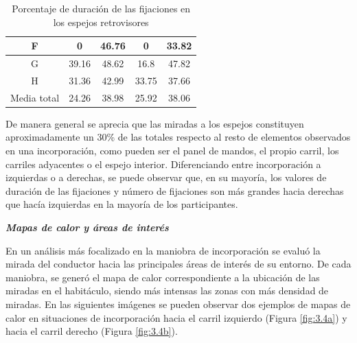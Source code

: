 \begin{table}[htbp]
\begin{tabular}{@{}ccc|cc@{}}
{F}                        & 0                                                                   & 46.76                                                               & 0                                                                 & 33.82                                                              \\ \midrule
{G}                        & 39.16                                                               & 48.62                                                               & 16.8                                                              & 47.82                                                              \\ \midrule
{H}                        & 31.36                                                               & 42.99                                                               & 33.75                                                             & 37.66                                                              \\ \midrule
{Media total}              & 24.26                                                               & 38.98                                                               & 25.92                                                             & 38.06                                                              \\ \bottomrule
\end{tabular}
\caption{Porcentaje de duración de las fijaciones en los espejos retrovisores}
\label{tab:3.5}
\end{table}

De manera general se aprecia que las miradas a los espejos constituyen aproximadamente un 30\% de las totales respecto al resto de elementos observados en una incorporación, como pueden ser el panel de mandos, el propio carril, los carriles adyacentes o el espejo interior.  Diferenciando entre incorporación a izquierdas o a derechas, se puede observar que, en su mayoría, los valores de duración de las fijaciones y número de fijaciones son más grandes hacia derechas que hacía izquierdas en la mayoría de los participantes.

\newpage
\textbf{\emph{Mapas de calor y áreas de interés}}

En un análisis más focalizado en la maniobra de incorporación se evaluó la mirada del conductor hacia las principales áreas de interés de su entorno. De cada maniobra, se generó el mapa de calor correspondiente a la ubicación de las miradas en el habitáculo, siendo más intensas las zonas con más densidad de miradas. En las siguientes imágenes se pueden observar dos ejemplos de mapas de calor en situaciones de incorporación hacia el carril izquierdo (Figura \ref{fig:3.4a}) y hacia el carril derecho (Figura \ref{fig:3.4b}).

